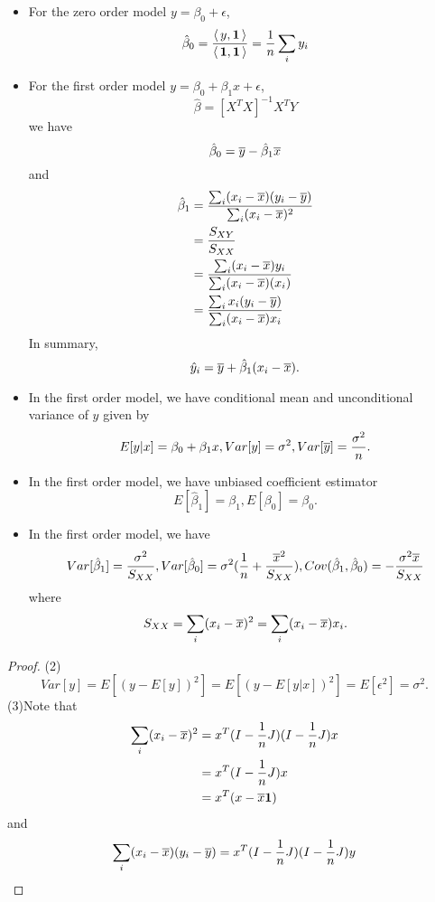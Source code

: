 \begin{refsection}
\begin{corollary}\hfill
	\begin{itemize}
		\item For the zero order model $y = \beta_0 + \epsilon$, $$\hat{\beta}_0 = \frac{{\left< \, y,\bm{1} \, \right>}}{{\left< \, \bm{1},\bm{1} \, \right>}} = \frac{1}{n}\sum_i y_i$$
		\item For the first order model $y = \beta_0 +\beta_1 x+ \epsilon$, $$\hat{\beta} = [X^TX]^{-1}X^TY$$
		we have $$\hat{\beta}_0 = \overline{y} - \hat{\beta}_1\overline{x}$$ and
		\begin{align*}
		\hat{\beta}_1 &= \frac{\sum_i (x_{i}-\overline{x})(y_i - \overline{y})}{\sum_i (x_{i}-\overline{x})^2} \\
		& = \frac{S_{XY}}{S_{XX}} \\
		& = \frac{\sum_i (x_{i}-\overline{x})y_i }{\sum_i (x_{i}-\overline{x})(x_i)} \\
		& = \frac{\sum_i x_{i}(y_i - \overline{y})}{\sum_i (x_{i}-\overline{x})x_i} 
		\end{align*}
		In summary, $$\hat{y}_i = \overline{y} + \hat{\beta}_1(x_i - \overline{x}).$$
		\item In the first order model, we have conditional mean and  unconditional variance of $y$ given by
		$$E[y|x] = \beta_0+\beta_1x, Var[y] = \sigma^2, Var[\overline{y}]=\frac{\sigma^2}{n}.$$
		\item In the first order model, we have unbiased coefficient estimator
		$$E[\hat{\beta}_1] = \beta_1, E[\beta_0] = \beta_0.$$
		\item In the first order model, we have 
		$$Var[\hat{\beta}_1] = \frac{\sigma^2}{S_{XX}}, Var[\hat{\beta}_0] = \sigma^2(\frac{1}{n} + \frac{\overline{x}^2}{S_{XX}}),Cov(\hat{\beta}_1,\hat{\beta}_0) = -\frac{\sigma^2\overline{x}}{S_{XX}}$$
		where
		$$S_{XX} = \sum_i (x_{i}-\overline{x})^2=\sum_i (x_{i}-\overline{x})x_i.$$
	\end{itemize}
\end{corollary}
\begin{proof}
(2)
$$Var[y] = E[(y-E[y])^2] = E[(y-E[y|x])^2] = E[\epsilon^2] = \sigma^2.$$	
(3)Note that 
\begin{align*}
\sum_i (x_{i}-\overline{x})^2 &= x^T(I-\frac{1}{n}J)(I-\frac{1}{n}J)x \\
&= x^T(I-\frac{1}{n}J)x \\
&= x^T(x-\overline{x}\bm{1}) 
\end{align*}
and
\begin{align*}
\sum_i (x_{i}-\mean{x})(y_i - \mean{y}) &= x^T(I-\frac{1}{n}J)(I-\frac{1}{n}J)y \\

\end{align*}
\end{proof}
\end{refsection}
